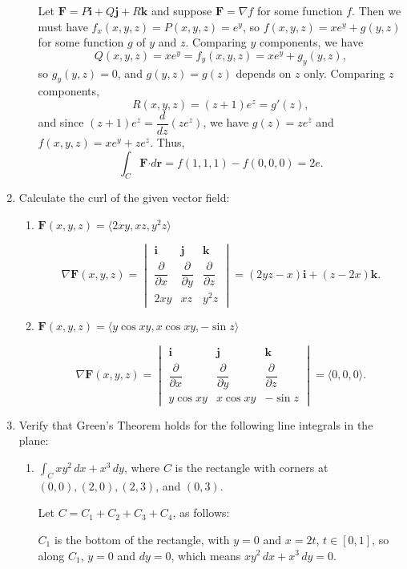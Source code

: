 \documentclass[letterpaper,12pt]{article}
\renewcommand{\i}{\mathbf{i}}
\renewcommand{\j}{\mathbf{j}}
\renewcommand{\k}{\mathbf{k}}
\newcommand{\pd}[2]{\dfrac{\partial #1}{\partial #2}}
\renewcommand{\r}{\mathbf{r}}
\newcommand{\dotp}{\boldsymbol{\cdot}}
\newcommand{\F}{\mathbf{F}}
\begin{document}
\begin{enumerate}
\begin{enumerate}
\bigskip

Let $\F = P\i+Q\j+R\k$ and suppose $\F = \nabla f$ for some function $f$. Then we must have $f_x(x,y,z) = P(x,y,z) = e^y$, so $f(x,y,z) = xe^y+g(y,z)$ for some function $g$ of $y$ and $z$. Comparing $y$ components, we have
\[
 Q(x,y,z) = xe^y = f_y(x,y,z) = xe^y+g_y(y,z),
\]
so $g_y(y,z) = 0$, and $g(y,z) = g(z)$ depends on $z$ only. Comparing $z$ components, 
\[
 R(x,y,z) = (z+1)e^z = g'(z),
\]
and since $(z+1)e^z = \dfrac{d}{dz}(ze^z)$, we have $g(z)=ze^z$ and $f(x,y,z) = xe^y+ze^z$. Thus,
\[
 \int_C\F\dotp d\r = f(1,1,1)-f(0,0,0) = 2e.
\]

\end{enumerate}
 \item Calculate the curl of the given vector field:
\begin{enumerate}
 \item $\F(x,y,z) = \langle 2xy, xz, y^2z\rangle$

\bigskip

\[
 \nabla \F(x,y,z) = \begin{vmatrix} \i&\j&\k\\ \pd{}{x} & \pd{}{y} & \pd{}{z}\\ 2xy & xz & y^2z\end{vmatrix} = (2yz-x)\i+(z-2x)\k.
\]

 \item $\F(x,y,z) = \langle y\cos xy, x\cos xy, -\sin z\rangle$

\bigskip

\[
 \nabla \F(x,y,z) = \begin{vmatrix} \i&\j&\k\\ \pd{}{x} & \pd{}{y} & \pd{}{z}\\y\cos xy & x\cos xy & -\sin z\end{vmatrix} = \langle 0,0,0\rangle.
\]

\end{enumerate}
 \item Verify that Green's Theorem holds for the following line integrals in the plane:
\begin{enumerate}
 \item $\int_C xy^2\,dx+x^3\,dy$, where $C$ is the rectangle with corners at $(0,0), (2,0), (2,3)$, and $(0,3)$.

\bigskip

Let $C=C_1+C_2+C_3+C_4$, as follows:

$C_1$ is the bottom of the rectangle, with $y=0$ and $x=2t$, $t\in [0,1]$, so along $C_1$, $y=0$ and $dy=0$, which means $xy^2\,dx+x^3\,dy = 0$.


\end{enumerate}
\end{enumerate}
\end{document}
